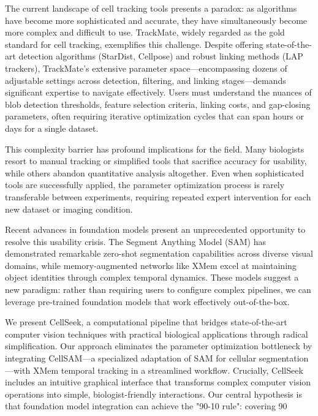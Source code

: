 \documentclass[12pt]{article}
\begin{document}
The current landscape of cell tracking tools presents a paradox: as algorithms have become more sophisticated and accurate, they have simultaneously become more complex and difficult to use. TrackMate, widely regarded as the gold standard for cell tracking, exemplifies this challenge. Despite offering state-of-the-art detection algorithms (StarDist, Cellpose) and robust linking methods (LAP trackers), TrackMate's extensive parameter space—encompassing dozens of adjustable settings across detection, filtering, and linking stages—demands significant expertise to navigate effectively. Users must understand the nuances of blob detection thresholds, feature selection criteria, linking costs, and gap-closing parameters, often requiring iterative optimization cycles that can span hours or days for a single dataset.

This complexity barrier has profound implications for the field. Many biologists resort to manual tracking or simplified tools that sacrifice accuracy for usability, while others abandon quantitative analysis altogether. Even when sophisticated tools are successfully applied, the parameter optimization process is rarely transferable between experiments, requiring repeated expert intervention for each new dataset or imaging condition.

Recent advances in foundation models present an unprecedented opportunity to resolve this usability crisis. The Segment Anything Model (SAM) has demonstrated remarkable zero-shot segmentation capabilities across diverse visual domains, while memory-augmented networks like XMem excel at maintaining object identities through complex temporal dynamics. These models suggest a new paradigm: rather than requiring users to configure complex pipelines, we can leverage pre-trained foundation models that work effectively out-of-the-box.

We present CellSeek, a computational pipeline that bridges state-of-the-art computer vision techniques with practical biological applications through radical simplification. Our approach eliminates the parameter optimization bottleneck by integrating CellSAM—a specialized adaptation of SAM for cellular segmentation—with XMem temporal tracking in a streamlined workflow. Crucially, CellSeek includes an intuitive graphical interface that transforms complex computer vision operations into simple, biologist-friendly interactions. Our central hypothesis is that foundation model integration can achieve the "90-10 rule": covering 90%
\end{document}
